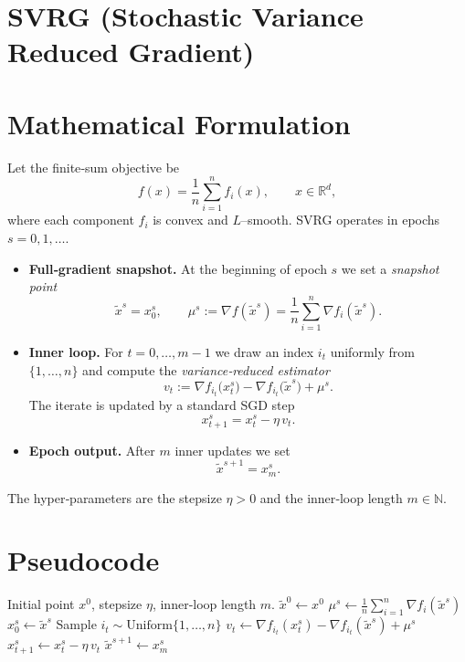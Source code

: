 \documentclass{article}
\begin{document}
\section*{SVRG (Stochastic Variance Reduced Gradient)}

\section*{Mathematical Formulation}
Let the finite‑sum objective be
\[
f(x)=\frac{1}{n}\sum_{i=1}^{n} f_i(x),\qquad x\in\mathbb{R}^{d},
\]
where each component $f_i$ is convex and $L$–smooth.  
SVRG operates in epochs $s=0,1,\dots$.
\begin{itemize}
\item \textbf{Full‑gradient snapshot.} At the beginning of epoch $s$ we set a \emph{snapshot point}
\[
\tilde{x}^{s}=x^{s}_0,
\qquad 
\mu^{s}:=\nabla f(\tilde{x}^{s})=\frac{1}{n}\sum_{i=1}^{n}\nabla f_i(\tilde{x}^{s}).
\]
\item \textbf{Inner loop.} For $t=0,\dots,m-1$ we draw an index $i_t$ uniformly from $\{1,\dots,n\}$ and compute the \emph{variance‑reduced estimator}
\[
v_t:=\nabla f_{i_t}\!\bigl(x^{s}_t\bigr)-\nabla f_{i_t}\!\bigl(\tilde{x}^{s}\bigr)+\mu^{s}.
\]
The iterate is updated by a standard SGD step
\[
x^{s}_{t+1}=x^{s}_t-\eta\,v_t .
\]
\item \textbf{Epoch output.} After $m$ inner updates we set
\[
\tilde{x}^{s+1}=x^{s}_m .
\]
\end{itemize}
The hyper‑parameters are the stepsize $\eta>0$ and the inner‑loop length $m\in\mathbb{N}$.

\section*{Pseudocode}
\begin{algorithm}[H]
\caption{SVRG}
\begin{algorithmic}[1]
\Require Initial point $x^{0}$, stepsize $\eta$, inner‑loop length $m$.
\State $\tilde{x}^{0}\gets x^{0}$
    \State $\mu^{s}\gets \displaystyle\frac1n\sum_{i=1}^{n}\nabla f_i(\tilde{x}^{s})$ 
    \State $x^{s}_0\gets \tilde{x}^{s}$
        \State Sample $i_t\sim\text{Uniform}\{1,\dots,n\}$
        \State $v_t\gets \nabla f_{i_t}(x^{s}_t)-\nabla f_{i_t}(\tilde{x}^{s})+\mu^{s}$
        \State $x^{s}_{t+1}\gets x^{s}_t-\eta\,v_t$
    \EndFor
    \State $\tilde{x}^{s+1}\gets x^{s}_m$
\EndFor
\end{algorithmic}
\end{algorithm}
\end{document}
